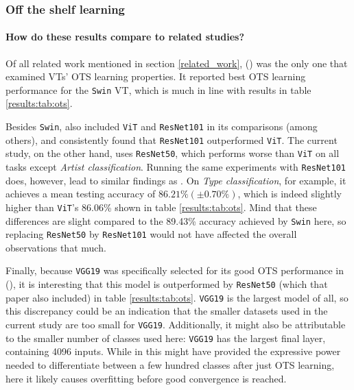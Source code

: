 \subsubsection{Off the shelf learning}

\paragraph{How do these results compare to related studies?}
Of all related work mentioned in section \ref{related_work}, \citeauthor{zhou2021convnets} (\citeyear{zhou2021convnets}) was the only one that examined VTs' OTS learning properties. It reported best OTS learning performance for the \texttt{Swin} VT, which is much in line with results in table \ref{results:tab:ots}.

Besides \texttt{Swin}, \citeauthor{zhou2021convnets} also included \texttt{ViT} and \texttt{ResNet101} in its comparisons (among others), and consistently found that \texttt{ResNet101} outperformed \texttt{ViT}. The current study, on the other hand, uses \texttt{ResNet50}, which performs worse than \texttt{ViT} on all tasks except \textit{Artist classification}. Running the same experiments with \texttt{ResNet101} does, however, lead to similar findings as \citeauthor{zhou2021convnets}. On \textit{Type classification}, for example, it achieves a mean testing accuracy of  $86.21\% (\pm 0.70\%)$, which is indeed slightly higher than \texttt{ViT}'s 86.06\% shown in table \ref{results:tab:ots}. Mind that these differences are slight compared to the 89.43\% accuracy achieved by \texttt{Swin} here, so replacing \texttt{ResNet50} by \texttt{ResNet101} would not have affected the overall observations that much.

Finally, because \texttt{VGG19} was specifically selected for its good OTS performance in \citeauthor{sabatelli2018deep} (\citeyear{sabatelli2018deep}), it is interesting that this model is outperformed by \texttt{ResNet50} (which that paper also included) in table \ref{results:tab:ots}. \texttt{VGG19} is the largest model of all, so this discrepancy could be an indication that the smaller datasets used in the current study are too small for \texttt{VGG19}. Additionally, it might also be attributable to the smaller number of classes used here: \texttt{VGG19} has the largest final layer, containing 4096 inputs. While in \citeauthor{sabatelli2018deep} this might have provided the expressive power needed to differentiate between a few hundred classes after just OTS learning, here it likely causes overfitting before good convergence is reached.

